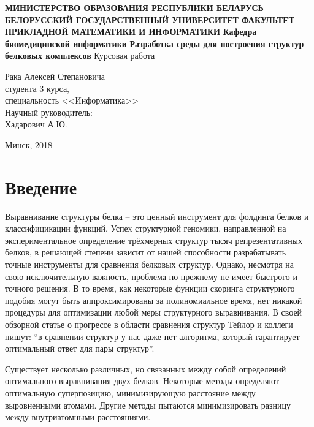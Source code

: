 \documentclass[a4paper]{extreport}
\begin{document}
\begin{titlepage}
\begin{center}
    \small
    \textbf{МИНИСТЕРСТВО ОБРАЗОВАНИЯ РЕСПУБЛИКИ БЕЛАРУСЬ}
    \vspace{0.25cm}
    \textbf{БЕЛОРУССКИЙ ГОСУДАРСТВЕННЫЙ УНИВЕРСИТЕТ}
    \vspace{0.25cm}
    \textbf{ФАКУЛЬТЕТ ПРИКЛАДНОЙ МАТЕМАТИКИ И ИНФОРМАТИКИ}
    \vspace{0.25cm}
    \normalsize
    \textbf{Кафедра биомедицинской информатики}
    \vfill
        \large
    \textbf{Разработка среды для построения структур белковых комплексов}
    \vfill
    \normalsize
    Курсовая работа
\end{center}
\vfill
\hfill\begin{minipage}{0.5\textwidth}
    Рака Алексей Степановича\\
    студента 3 курса,\\
    специальность <<Информатика>>
    \vspace{0.25cm}
    \\
    Научный руководитель:\\
    Хадарович А.Ю.
\end{minipage}
\bigskip
\begin{center}
    Минск, 2018
\end{center}
\end{titlepage}
\tableofcontents
\newpage
\normalsize
{}
\chapter*{ Введение }
Выравнивание структуры белка – это ценный инструмент для фолдинга белков и классифицикации функций. Успех структурной геномики, направленной на экспериментальное определение трёхмерных структур тысяч репрезентативных белков, в решающей степени зависит от нашей способности разрабатывать точные инструменты для сравнения белковых структур. Однако, несмотря на свою исключительную важность, проблема по-прежнему не имеет быстрого и точного решения. В то время, как некоторые функции скоринга структурного подобия могут быть аппроксимированы за полиномиальное время, нет никакой процедуры для оптимизации любой меры структурного выравнивания. В своей обзорной статье о прогрессе в области сравнения структур Тейлор и коллеги пишут: “в сравнении структур у нас даже нет алгоритма, который гарантирует оптимальный ответ для пары структур”.

Существует несколько различных, но связанных между собой определений оптимального выравнивания двух белков. Некоторые методы определяют оптимальную суперпозицию, минимизирующую расстояние между выровненными атомами. Другие методы пытаются минимизировать разницу между внутриатомными расстояниями.
\end{document}
